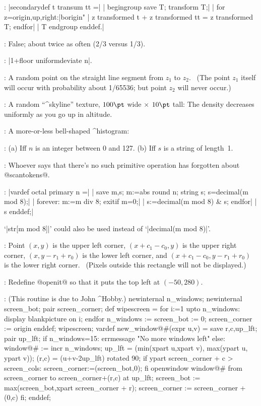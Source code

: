 :
 |secondarydef t transum tt =|\parbreak
| begingroup save T; transform T;|\parbreak
| for z=origin,up,right:|^^"origin"\parbreak
|  z transformed t + z transformed tt = z transformed T; endfor|\parbreak
|  T endgroup enddef.|

:
 False; about twice as often (2/3 versus 1/3).

:
 |1+floor uniformdeviate n|.

:
 A random point on the straight line segment from $z_1$ to $z_2$.
\ (The point $z_1$ itself will occur with probability about 1/65536;
but point $z_2$ will never occur.)

:
 A random ``^{skyline}'' texture, $100\pt$ wide $\times$ $10\pt$ tall:
{\rand{}} The density decreases uniformly as you go up in altitude.

:
 A more-or-less bell-shaped ^{histogram}: {\rand{}}

:
 (a) Iff $n$ is an integer between 0 and 127.
(b) Iff $s$ is a string of length~1.

:
 Whoever says that there's no such primitive operation has
forgotten about @scantokens@.

:
 |vardef octal primary n =|\parbreak
| save m,s; m:=abs round n; string s; s=decimal(m mod 8);|\parbreak
| forever: m:=m div 8; exitif m=0;|\parbreak
|  s:=decimal(m mod 8) & s; endfor|\parbreak
| s enddef;|\par\nobreak\medskip\noindent
`|str[m mod 8]|' could also be used instead of `|decimal(m mod 8)|'.

:
 Point $(x,y)$ is the upper left corner, ${(x+c_1-c_0,y)}$ is the
upper right corner, ${(x,y-r_1+r_0)}$ is the lower left corner, and
${(x+c_1-c_0,y-r_1+r_0)}$ is the lower right corner. \ (Pixels
outside this rectangle will not be displayed.)

:
 Redefine @openit@ so that it puts the top left at $(-50,280)$.

:
 (This routine is due to John ^{Hobby}.)
\begintt
newinternal n_windows;    %
newinternal screen_bot;   %
pair screen_corner;       %
def wipescreen =          %
 for i:=1 upto n_windows: display blankpicture on i; endfor
 n_windows := screen_bot := 0; screen_corner := origin enddef;
wipescreen;
vardef new_window@#(expr u,v) = save r,c,up_lft; pair up_lft;
 if n_windows=15: errmessage "No more windows left"
 else: window@# := incr n_windows;
 up_lft = (min(xpart u,xpart v), max(ypart u, ypart v));
 (r,c) = (u+v-2up_lft) rotated 90;
 if ypart screen_corner + c > screen_cols:
  screen_corner:=(screen_bot,0); fi
 openwindow window@# from screen_corner
  to screen_corner+(r,c) at up_lft;
 screen_bot := max(screen_bot,xpart screen_corner + r);
 screen_corner := screen_corner + (0,c) fi; enddef;
\endtt

